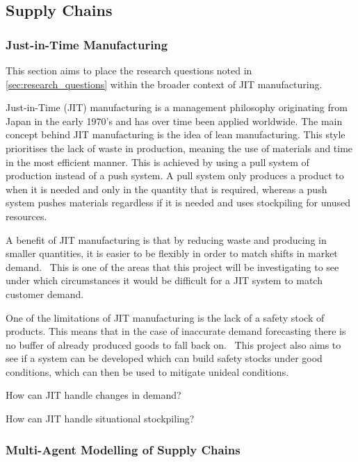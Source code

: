 \subsection{Supply Chains}

\subsubsection{Just-in-Time Manufacturing}

This section aims to place the research questions noted in \cref{sec:research_questions} within the broader context of JIT manufacturing.

Just-in-Time (JIT) manufacturing is a management philosophy originating from Japan in the early 1970's and has over time been applied worldwide.
The main concept behind JIT manufacturing is the idea of lean manufacturing.
This style prioritises the lack of waste in production, meaning the use of materials and time in the most efficient manner.
This is achieved by using a pull system of production instead of a push system.
A pull system only produces a product to when it is needed and only in the quantity that is required, whereas a push system pushes materials regardless if it is needed and uses stockpiling for unused resources.~\cite{javadian2013just}

A benefit of JIT manufacturing is that by reducing waste and producing in smaller quantities, it is easier to be flexibly in order to match shifts in market demand.~\cite{javadian2013just}
This is one of the areas that this project will be investigating to see under which circumstances it would be difficult for a JIT system to match customer demand.

One of the limitations of JIT manufacturing is the lack of a safety stock of products.
This means that in the case of inaccurate demand forecasting there is no buffer of already produced goods to fall back on.~\cite{javadian2013just}
This project also aims to see if a system can be developed which can build safety stocks under good conditions, which can then be used to mitigate unideal conditions.

How can JIT handle changes in demand?

How can JIT handle situational stockpiling?

\subsubsection{Multi-Agent Modelling of Supply Chains}

